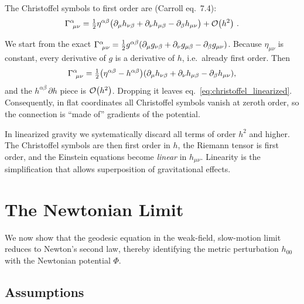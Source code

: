 The Christoffel symbols to first order are (Carroll eq.~7.4):
\begin{equation}
    \Gamma^{\alpha}_{\ \mu \nu}
    = \tfrac{1}{2} \eta^{\alpha\beta}\bigl(
    \partial_\mu h_{\nu\beta} + \partial_\nu h_{\mu\beta}
    - \partial_\beta h_{\mu\nu}\bigr) + \mathcal{O}\!\left(h^2\right) \,.
    \label{eq:christoffel_linearized}
\end{equation}

\begin{derivation}
We start from the exact
$\Gamma^{\alpha}_{\ \mu \nu} = \tfrac12 g^{\alpha\beta}
(\partial_\mu g_{\nu\beta} + \partial_\nu g_{\mu\beta} - \partial_\beta g_{\mu\nu})$.
Because $\eta_{\mu\nu}$ is constant, every derivative of $g$ is a
derivative of $h$, i.e.\ already first order.  Then
\[
\Gamma^{\alpha}_{\ \mu \nu}
= \tfrac12\bigl(\eta^{\alpha\beta} - h^{\alpha\beta}\bigr)
  (\partial_\mu h_{\nu\beta} + \partial_\nu h_{\mu\beta} - \partial_\beta h_{\mu\nu}) ,
\]
and the $h^{\alpha\beta}\,\partial h$ piece is $\mathcal{O}\!\left(h^2\right)$.  Dropping it
leaves eq.~\eqref{eq:christoffel_linearized}.  Consequently, in flat
coordinates all Christoffel symbols vanish at zeroth order, so the
connection is ``made of'' gradients of the potential.
\end{derivation}


\begin{remark}
In linearized gravity we systematically discard all terms of order
$h^2$ and higher.  The Christoffel symbols are then first order
in $h$, the Riemann tensor is first order, and the Einstein equations
become \emph{linear} in $h_{\mu\nu}$.  Linearity is the
simplification that allows superposition of gravitational effects.
\end{remark}


\section{The Newtonian Limit}
\label{sec:newtonian_limit}

We now show that the geodesic equation in the weak-field, slow-motion
limit reduces to Newton's second law, thereby identifying the metric
perturbation $h_{00}$ with the Newtonian potential $\Phi$.

\subsection{Assumptions}

